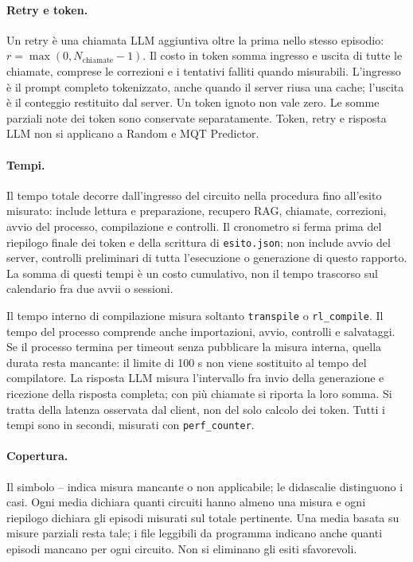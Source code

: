 \paragraph{Retry e token.}
Un retry è una chiamata LLM aggiuntiva oltre la prima nello stesso episodio:
\(r=\max(0,N_{\mathrm{chiamate}}-1)\). Il costo in token somma ingresso e uscita
di tutte le chiamate, comprese le correzioni e i tentativi falliti quando
misurabili. L'ingresso è il prompt completo tokenizzato, anche quando il server
riusa una cache; l'uscita è il conteggio restituito dal server. Un token ignoto
non vale zero. Le somme parziali note dei token sono conservate separatamente.
Token, retry e risposta LLM non si applicano a Random e MQT Predictor.

\paragraph{Tempi.}
Il tempo totale decorre dall'ingresso del circuito nella procedura fino all'esito
misurato: include lettura e preparazione, recupero RAG, chiamate, correzioni,
avvio del processo, compilazione e controlli. Il cronometro si ferma prima del
riepilogo finale dei token e della scrittura di \texttt{esito.json}; non include
avvio del server, controlli preliminari di tutta l'esecuzione o generazione di
questo rapporto. La somma di questi tempi è un costo cumulativo, non il tempo
trascorso sul calendario fra due avvii o sessioni.

Il tempo interno di compilazione misura soltanto \texttt{transpile} o
\texttt{rl\_compile}. Il tempo del processo comprende anche importazioni, avvio,
controlli e salvataggi. Se il processo termina per timeout senza pubblicare la
misura interna, quella durata resta mancante: il limite di 100 s non viene
sostituito al tempo del compilatore. La risposta LLM misura l'intervallo fra
invio della generazione e ricezione della risposta completa; con più chiamate
si riporta la loro somma. Si tratta della latenza osservata dal client, non del
solo calcolo dei token. Tutti i tempi sono in secondi, misurati con
\texttt{perf\_counter}.

\paragraph{Copertura.}
Il simbolo -- indica misura mancante o non applicabile; le didascalie distinguono
i casi. Ogni media dichiara quanti circuiti hanno almeno una misura e ogni
riepilogo dichiara gli episodi misurati sul totale pertinente. Una media basata
su misure parziali resta tale; i file leggibili da programma indicano anche
quanti episodi mancano per ogni circuito. Non si eliminano gli esiti sfavorevoli.


